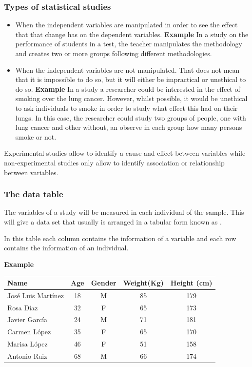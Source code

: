 \begin{frame}
\frametitle{Types of statistical studies}
\begin{itemize}
\item {} When the independent variables are manipulated in order to see the effect that that change has on the dependent variables.\newline
\textbf{Example} In a study on the performance of students in a test, the teacher manipulates the methodology and creates two or more groups following different methodologies.
\item {} When the independent variables are not manipulated. That does not mean that it is
impossible to do so, but it will either be impractical or unethical to do so.\newline
\textbf{Example} In a study a researcher could be interested in the effect of smoking over the lung
cancer.
However, whilst possible, it would be unethical to ask individuals to smoke in order to study what effect this had on
their lungs. In this case, the researcher could study two groups of people, one with lung cancer and other
without, an observe in each group how many persons smoke or not.
\end{itemize}

Experimental studies allow to identify a cause and effect between variables while non-experimental studies
only allow to identify association or relationship between variables.
\end{frame}


\begin{frame}
\frametitle{The data table}
The variables of a study will be measured in each individual of the sample.
This will give a data set that usually is arranged in a tabular form known as .

In this table each column contains the information of a variable and each row contains the information of an individual.

\textbf{Example}
\begin{center}
\begin{tabular}{|l|c|c|c|c|}
\hline
Name & Age & Gender & Weight(Kg) & Height (cm)\\
\hline
José Luis Martínez & 18 & M &  85 & 179 \\
Rosa Díaz & 32 & F & 65 & 173 \\
Javier García & 24 & M & 71 & 181 \\
Carmen López & 35 & F &  65 & 170 \\
Marisa López  & 46 & F &  51 & 158 \\
Antonio Ruiz & 68 & M & 66 & 174 \\
\hline
\end{tabular}
\end{center}
\end{frame}


